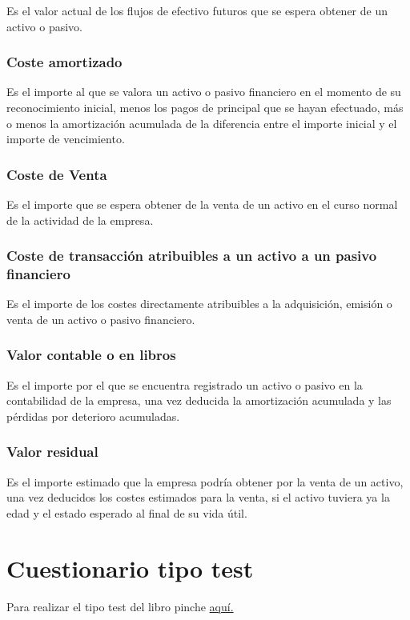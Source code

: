 \documentclass[a4paper,12pt]{article}
\begin{document}
Es el valor actual de los flujos de efectivo futuros que se espera obtener de un activo o pasivo.\\

\subsubsection{Coste amortizado}

Es el importe al que se valora un activo o pasivo financiero en el momento de su reconocimiento inicial, menos los pagos de principal que se hayan efectuado, más o menos la amortización acumulada de la diferencia entre el importe inicial y el importe de vencimiento.\\

\subsubsection{Coste de Venta}

Es el importe que se espera obtener de la venta de un activo en el curso normal de la actividad de la empresa.\\

\subsubsection{Coste de transacción atribuibles a un activo a un pasivo financiero}

Es el importe de los costes directamente atribuibles a la adquisición, emisión o venta de un activo o pasivo financiero.\\

\subsubsection{Valor contable o en libros}

Es el importe por el que se encuentra registrado un activo o pasivo en la contabilidad de la empresa, una vez deducida la amortización acumulada y las pérdidas por deterioro acumuladas.\\

\subsubsection{Valor residual}

Es el importe estimado que la empresa podría obtener por la venta de un activo, una vez deducidos los costes estimados para la venta, si el activo tuviera ya la edad y el estado esperado al final de su vida útil.\\










\newpage
\section{Cuestionario tipo test}
Para realizar el tipo test del libro pinche \href{https://elblogdeismael.github.io/Asignaturas/Tercer%20A%C3%B1o/CF1/Tests/testT1Libro.html}{aquí.}
\end{document}
